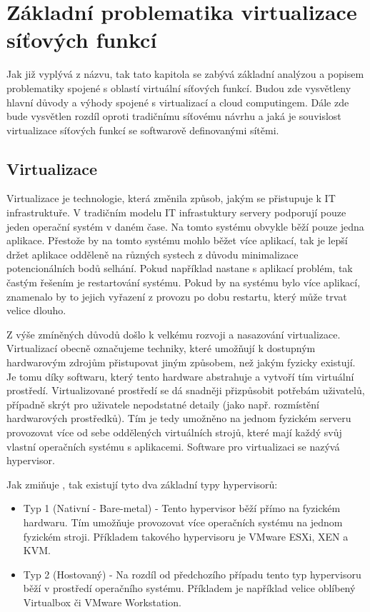 \chapter{Základní problematika virtualizace síťových funkcí}

Jak již vyplývá z názvu, tak tato kapitola se zabývá základní analýzou a popisem problematiky spojené s oblastí virtuální síťových funkcí. Budou zde vysvětleny hlavní důvody a výhody spojené s virtualizací a cloud computingem. Dále zde bude vysvětlen rozdíl oproti tradičnímu síťovému návrhu a jaká je souvislost virtualizace síťových funkcí se softwarově definovanými sítěmi.

\section{Virtualizace}

Virtualizace je technologie, která změnila způsob, jakým se přistupuje k IT infrastruktuře. V tradičním modelu IT infrastuktury servery podporují pouze jeden operační systém v daném čase. Na tomto systému obvykle běží pouze jedna aplikace. Přestože by na tomto systému mohlo běžet více aplikací, tak je lepší držet aplikace odděleně na různých systech z důvodu minimalizace potencionálních bodů selhání. Pokud například nastane s aplikací problém, tak častým řešením je restartování systému. Pokud by na systému bylo více aplikací, znamenalo by to jejich vyřazení z provozu po dobu restartu, který může trvat velice dlouho. \cite{VM_book}

Z výše zmíněných důvodů došlo k velkému rozvoji a nasazování virtualizace. Virtualizací obecně označujeme techniky, které umožňují k dostupným hardwarovým zdrojům přistupovat jiným způsobem, než jakým fyzicky existují. Je tomu díky softwaru, který tento hardware abstrahuje a vytvoří tím virtuální prostředí. Virtualizované prostředí se dá snadněji přizpůsobit potřebám uživatelů, případně skrýt pro uživatele nepodstatné detaily (jako např. rozmístění hardwarových prostředků). Tím je tedy umožněno na jednom fyzickém serveru provozovat více od sebe oddělených virtuálních strojů, které mají každý svůj vlastní operačních systému s aplikacemi. Software pro virtualizaci se nazývá hypervisor.\cite{VM_book}

Jak zmiňuje \cite{VM_architektura}, tak existují tyto dva základní typy hypervisorů:

\begin{itemize}
\item Typ 1 (Nativní - Bare-metal) - Tento hypervisor běží přímo na fyzickém hardwaru. Tím umožňuje provozovat více operačních systému na jednom fyzickém stroji. Příkladem takového hypervisoru je VMware ESXi, XEN a KVM.
\item Typ 2 (Hostovaný) - Na rozdíl od předchozího případu tento typ hypervisoru běží v prostředí operačního systému. Příkladem je například velice oblíbený Virtualbox či VMware Workstation.
\end{itemize}

